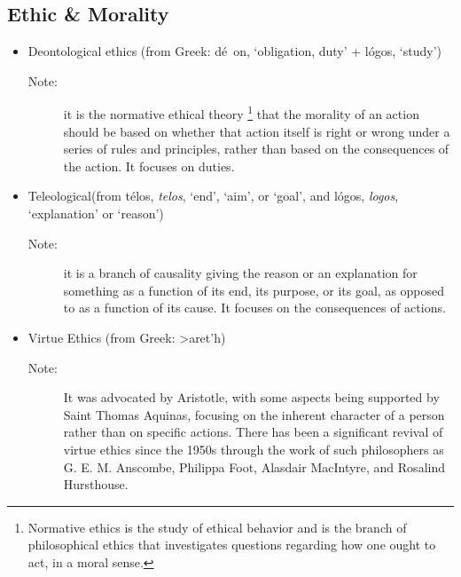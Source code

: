 \subsubsection*{}

\subsection*{Ethic \& Morality}
\begin{itemize}
    \item Deontological ethics (from Greek: \textgreek{d\'e\ on}, `obligation, duty' + \textgreek{l\'ogos}, `study')
        \begin{description}
            \item[Note:] it is the normative ethical theory \footnote{Normative ethics is the study of ethical behavior and is the branch of philosophical ethics that investigates questions regarding how one ought to act, in a moral sense.} that the morality of an action should be based on whether that action itself is right or wrong under a series of rules and principles, rather than based on the consequences of the action. It focuses on duties.
        \end{description}
    \item Teleological(from \textgreek{t\'elos}, \emph{telos}, `end', `aim', or `goal', and \textgreek{l\'ogos}, \emph{logos}, `explanation' or `reason')
        \begin{description}
            \item[Note:] it is a branch of causality giving the reason or an explanation for something as a function of its end, its purpose, or its goal, as opposed to as a function of its cause. It focuses on the consequences of actions. 
        \end{description}
    \item Virtue Ethics (from Greek: \textgreek{>aret'h})
        \begin{description}
            \item[Note:] It was advocated by Aristotle, with some aspects being supported by Saint Thomas Aquinas, focusing on the inherent character of a person rather than on specific actions. There has been a significant revival of virtue ethics since the 1950s through the work of such philosophers as G. E. M. Anscombe, Philippa Foot, Alasdair MacIntyre, and Rosalind Hursthouse.
        \end{description}
\end{itemize}

